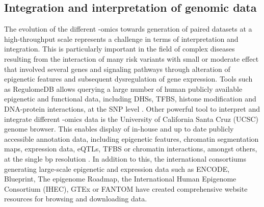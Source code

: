 


\subsection{Integration and interpretation of genomic data}
The evolution of the different -omics towards generation of paired datasets at a high-throughput scale represents a challenge in terms of interpretation and integration. This is particularly important in the field of complex diseases resulting from the interaction of many risk variants with small or moderate effect that involved several genes and signaling pathways through alteration of epigenetic features and subsequent dysregulation of gene expression.
Tools such as RegulomeDB allows querying a large number of human publicly available epigenetic and functional data, including DHSs, TFBS, histone modification and DNA-protein interactions, at the SNP level \parencite{Boyle2012}. Other powerful tool to interpret and integrate different -omics data is the University of California Santa Cruz (UCSC) genome browser. This enables display of in-house and up to date publicly accessible annotation data, including epigenetic features, chromatin segmentation maps, expression data, eQTLs, TFBS or chromatin interactions, amongst others, at the single bp resolution \parencite{Kent2002}. In addition to this, the international consortiums generating large-scale epigenetic and expression data such as ENCODE, Blueprint, The epigenome Roadmap, the International Human Epigenome Consortium (IHEC), GTEx or FANTOM have created comprehensive website resources for browsing and downloading data.

